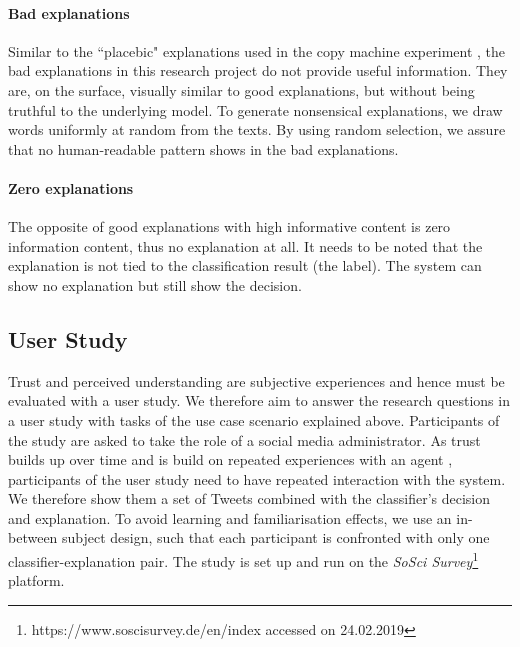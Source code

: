 \paragraph{Bad explanations}
Similar to the ``placebic" explanations used in the copy machine experiment \cite{langer1978mindlessness}, the bad explanations in this research project do not provide useful information. They are, on the surface, visually similar to good explanations, but without being truthful to the underlying model. To generate nonsensical explanations, we draw words uniformly at random from the texts. By using random selection, we assure that no human-readable pattern shows in the bad explanations.
\paragraph{Zero explanations}
The opposite of good explanations with high informative content is zero information content, thus no explanation at all. It needs to be noted that the explanation is not tied to the classification result (the label). The system can show no explanation but still show the decision. 



\subsection{User Study}
Trust and perceived understanding are subjective experiences and hence must be evaluated with a user study. We therefore aim to answer the research questions in a user study with tasks of the use case scenario explained above. Participants of the study are asked to take the role of a social media administrator. As trust builds up over time and is build on repeated experiences with an agent \cite{rempel1985trust}, participants of the user study need to have repeated interaction with the system. We therefore show them a set of Tweets combined with the classifier's decision and explanation. To avoid learning and familiarisation effects, we use an in-between subject design, such that each participant is confronted with only one classifier-explanation pair. The study is set up and run on the \textit{SoSci Survey}\footnote{https://www.soscisurvey.de/en/index accessed on 24.02.2019} platform.\newline

